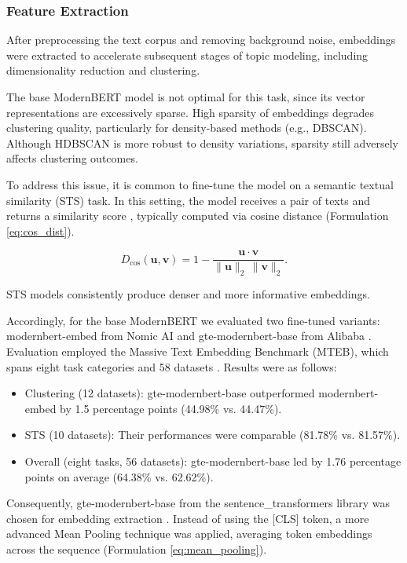 \subsubsection{Feature Extraction}
After preprocessing the text corpus and removing background noise, embeddings were extracted
to accelerate subsequent stages of topic modeling, including dimensionality reduction and clustering.

The base ModernBERT model is not optimal for this task, since its vector representations are excessively
sparse. High sparsity of embeddings degrades clustering quality, particularly for density-based methods
(e.g., DBSCAN). Although HDBSCAN is more robust to density variations, sparsity still adversely affects
clustering outcomes.

To address this issue, it is common to fine-tune the model on a semantic textual similarity (STS) task.
In this setting, the model receives a pair of texts and returns a similarity score \parencite{MTEB2023},
typically computed via cosine distance (Formulation \ref{eq:cos_dist}).

\begin{equation}\label{eq:cos_dist}
    D_{\cos}(\mathbf{u}, \mathbf{v})
    = 1 - \frac{\mathbf{u} \cdot \mathbf{v}}
                 {\|\mathbf{u}\|_2 \,\|\mathbf{v}\|_2}.
\end{equation}

STS models consistently produce denser and more informative embeddings.

Accordingly, for the base ModernBERT we evaluated two fine-tuned variants: modernbert-embed from Nomic AI
\parencite{nomic2024} and gte-modernbert-base from Alibaba \parencite{MGTE2023,MGTE2024}. Evaluation
employed the Massive Text Embedding Benchmark (MTEB), which spans eight task categories and 58 datasets
\parencite{MTEB2023}. Results were as follows:

\begin{itemize}
    \item Clustering (12 datasets): gte-modernbert-base outperformed modernbert-embed by 1.5 percentage
    points (44.98\% vs. 44.47\%).
    \item STS (10 datasets): Their performances were comparable (81.78\% vs. 81.57\%).
    \item Overall (eight tasks, 56 datasets): gte-modernbert-base led by 1.76 percentage points on average
    (64.38\% vs. 62.62\%).
\end{itemize}

Consequently, gte-modernbert-base from the sentence\_transformers library was chosen for embedding extraction
\parencite{SBERT2019}. Instead of using the [CLS] token, a more advanced Mean Pooling technique was applied,
averaging token embeddings across the sequence (Formulation \ref{eq:mean_pooling}).

